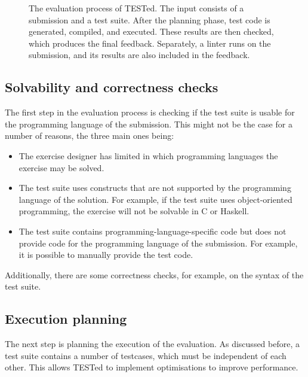 \documentclass[../main]{subfiles}
\begin{document}
\begin{figure}
    \centering
    
    \caption{
        The evaluation process of TESTed.
        The input consists of a submission and a test suite.
        After the planning phase, test code is generated, compiled, and executed.
        These results are then checked, which produces the final feedback.
        Separately, a linter runs on the submission, and its results are also included in the feedback.
    }
    \label{fig:flow}
\end{figure}

\subsection{Solvability and correctness checks}\label{subsec:solvability-and-correctness-checks}

The first step in the evaluation process is checking if the test suite is usable for the programming language of the submission.
This might not be the case for a number of reasons, the three main ones being:

\begin{itemize}
    \item The exercise designer has limited in which programming languages the exercise may be solved.
    \item The test suite uses constructs that are not supported by the programming language of the solution.
          For example, if the test suite uses object-oriented programming, the exercise will not be solvable in C or Haskell.
    \item The test suite contains programming-language-specific code but does not provide code for the programming language of the submission.
          For example, it is possible to manually provide the test code.
\end{itemize}

Additionally, there are some correctness checks, for example, on the syntax of the test suite.

\subsection{Execution planning}\label{subsec:execution-planning}

The next step is planning the execution of the evaluation.
As discussed before, a test suite contains a number of testcases, which must be independent of each other.
This allows TESTed to implement optimisations to improve performance.
\end{document}
